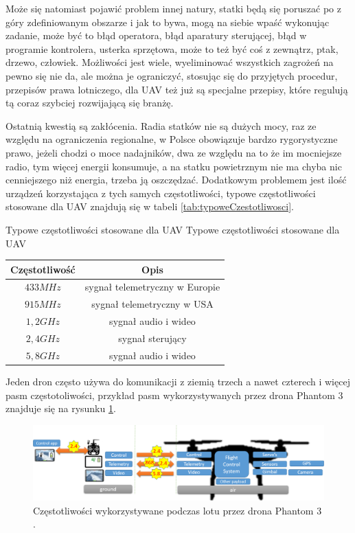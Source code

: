 Może się natomiast pojawić problem innej natury, statki będą się poruszać po z góry zdefiniowanym obszarze i jak to bywa, mogą na siebie wpaść wykonując zadanie, może być to błąd operatora, błąd aparatury sterującej, błąd w programie kontrolera, usterka sprzętowa, może to też być coś z zewnątrz, ptak, drzewo, człowiek. Możliwości jest wiele, wyeliminować wszystkich zagrożeń na pewno się nie da, ale można je ograniczyć, stosując się do przyjętych procedur, przepisów prawa lotniczego, dla UAV też już są specjalne przepisy, które regulują tą coraz szybciej rozwijającą się branżę.

Ostatnią kwestią są zakłócenia. Radia statków nie są dużych mocy, raz ze względu na ograniczenia regionalne, w Polsce obowiązuje bardzo rygorystyczne prawo, jeżeli chodzi o moce nadajników, dwa ze względu na to że im mocniejsze radio, tym więcej energii konsumuje, a na statku powietrznym nie ma chyba nic cenniejszego niż energia, trzeba ją oszczędzać. Dodatkowym problemem jest ilość urządzeń korzystająca z tych samych częstotliwości, typowe częstotliwości stosowane dla UAV znajdują się w tabeli \ref{tab:typoweCzestotliwosci}.
\begin{tablica}
    {Typowe częstotliwości stosowane dla UAV}
    {Typowe częstotliwości stosowane dla UAV}
    {
    \begin{tabular}{|c|c|} \hline
        Częstotliwość & Opis \\ \hline
        $433 MHz$  & sygnał telemetryczny w Europie \\ \hline
        $915 MHz$  & sygnał telemetryczny w USA \\ \hline
        $1,2 GHz$  & sygnał audio i wideo \\ \hline
        $2,4 GHz$  & sygnał sterujący \\ \hline
        $5,8 GHz$  & sygnał audio i wideo \\ \hline
   \end{tabular}
    }
    \label{tab:typoweCzestotliwosci}
\end{tablica}

Jeden dron często używa do komunikacji z ziemią trzech a nawet czterech i więcej pasm częstotoliwości, przykład pasm wykorzystywanych przez drona Phantom 3 znajduje się na rysunku \ref{fig:phantomczestotliwosci}.

\begin{figure}[!th]
    \centering
    \includegraphics[width=15cm]{zalaczniki/obrazy/phantom_czestotliwosci.png}
	\caption{Częstotliwości wykorzystywane podczas lotu przez drona Phantom 3 \cite{radiointerference}.}
    \label{fig:phantomczestotliwosci}
\end{figure}

